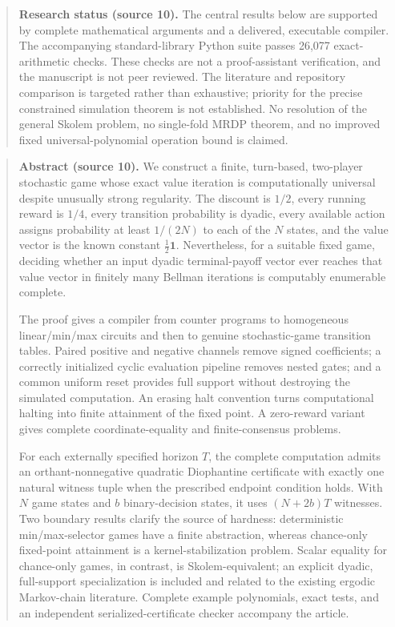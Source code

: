 \documentclass[11pt,letterpaper]{article}
\theoremstyle{definition}
\theoremstyle{remark}
\newcommand{\one}{\mathbf 1}
\begin{document}
\begin{quote}\small
\textbf{Research status (source 10).} The central results below are supported by complete
mathematical arguments and a delivered, executable compiler. The accompanying
standard-library Python suite passes 26,077 exact-arithmetic checks. These
checks are not a proof-assistant verification, and the manuscript is not
peer reviewed. The literature and repository comparison is targeted rather
than exhaustive; priority for the precise constrained simulation theorem
is not established. No resolution of the general Skolem problem, no
single-fold MRDP theorem, and no improved fixed universal-polynomial operation
bound is claimed.
\end{quote}
\begin{quote}\small
\textbf{Abstract (source 10).} We construct a finite, turn-based, two-player stochastic game whose exact
value iteration is computationally universal despite unusually strong
regularity. The discount is $1/2$, every running reward is $1/4$, every
transition probability is dyadic, every available action assigns probability
at least $1/(2N)$ to each of the $N$ states, and the value vector is the known
constant $\tfrac12\one$. Nevertheless, for a suitable fixed game, deciding
whether an input dyadic terminal-payoff vector ever reaches that value vector
in finitely many Bellman iterations is computably enumerable complete.

The proof gives a compiler from counter programs to homogeneous linear/min/max
circuits and then to genuine stochastic-game transition tables. Paired
positive and negative channels remove signed coefficients; a correctly
initialized cyclic evaluation pipeline removes nested gates; and a common
uniform reset provides full support without destroying the simulated
computation. An erasing halt convention turns computational halting into
finite attainment of the fixed point. A zero-reward variant gives complete
coordinate-equality and finite-consensus problems.

For each externally specified horizon $T$, the complete computation admits
an orthant-nonnegative quadratic Diophantine certificate with exactly one
natural witness tuple when the prescribed endpoint condition holds. With
$N$ game states and $b$ binary-decision states, it uses $(N+2b)T$ witnesses.
Two boundary results clarify the source of hardness: deterministic
min/max-selector games have a finite abstraction, whereas chance-only
fixed-point attainment is a kernel-stabilization problem. Scalar equality
for chance-only games, in contrast, is Skolem-equivalent; an explicit dyadic,
full-support specialization is included and related to the existing ergodic
Markov-chain literature. Complete example polynomials, exact tests, and an
independent serialized-certificate checker accompany the article.
\end{quote}
\end{document}

